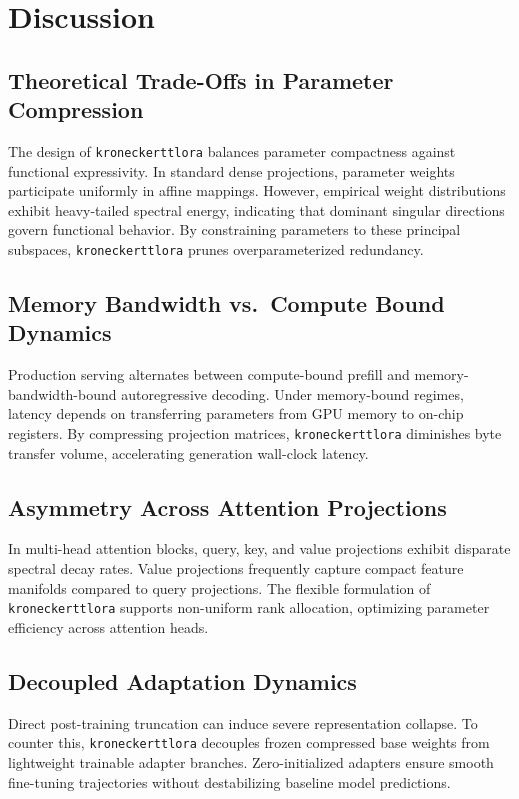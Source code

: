 \section{Discussion}

\subsection{Theoretical Trade-Offs in Parameter Compression}
The design of \texttt{kroneckerttlora} balances parameter compactness against functional expressivity. In standard dense projections, parameter weights participate uniformly in affine mappings. However, empirical weight distributions exhibit heavy-tailed spectral energy, indicating that dominant singular directions govern functional behavior. By constraining parameters to these principal subspaces, \texttt{kroneckerttlora} prunes overparameterized redundancy.

\subsection{Memory Bandwidth vs.\ Compute Bound Dynamics}
Production serving alternates between compute-bound prefill and memory-bandwidth-bound autoregressive decoding. Under memory-bound regimes, latency depends on transferring parameters from GPU memory to on-chip registers. By compressing projection matrices, \texttt{kroneckerttlora} diminishes byte transfer volume, accelerating generation wall-clock latency.

\subsection{Asymmetry Across Attention Projections}
In multi-head attention blocks, query, key, and value projections exhibit disparate spectral decay rates. Value projections frequently capture compact feature manifolds compared to query projections. The flexible formulation of \texttt{kroneckerttlora} supports non-uniform rank allocation, optimizing parameter efficiency across attention heads.

\subsection{Decoupled Adaptation Dynamics}
Direct post-training truncation can induce severe representation collapse. To counter this, \texttt{kroneckerttlora} decouples frozen compressed base weights from lightweight trainable adapter branches. Zero-initialized adapters ensure smooth fine-tuning trajectories without destabilizing baseline model predictions.

